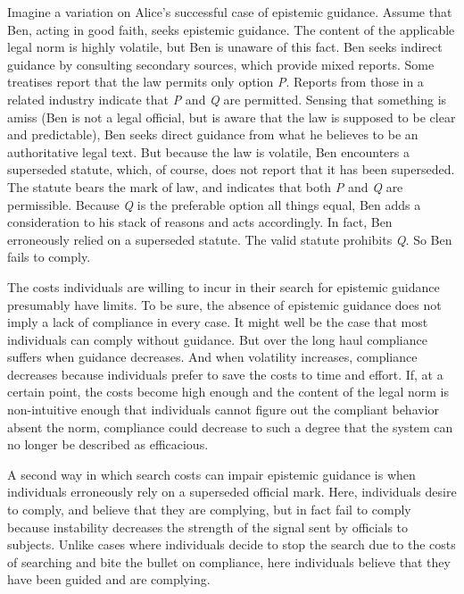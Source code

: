 Imagine a variation on Alice's successful case of epistemic guidance.
Assume that Ben, acting in good faith, seeks epistemic guidance. The
content of the applicable legal norm is highly volatile, but Ben is
unaware of this fact. Ben seeks indirect guidance by consulting
secondary sources, which provide mixed reports. Some treatises report
that the law permits only option \emph{P}. Reports from those in a
related industry indicate that \emph{P} and \emph{Q} are permitted.
Sensing that something is amiss (Ben is not a legal official, but is
aware that the law is supposed to be clear and predictable), Ben seeks
direct guidance from what he believes to be an authoritative legal text.
But because the law is volatile, Ben encounters a superseded statute,
which, of course, does not report that it has been superseded. The
statute bears the mark of law, and indicates that both \emph{P} and
\emph{Q} are permissible. Because \emph{Q} is the preferable option all
things equal, Ben adds a consideration to his stack of reasons and acts
accordingly. In fact, Ben erroneously relied on a superseded statute.
The valid statute prohibits \emph{Q}. So Ben fails to comply.

The costs individuals are willing to incur in their search for epistemic
guidance presumably have limits. To be sure, the absence of epistemic
guidance does not imply a lack of compliance in every case. It might
well be the case that most individuals can comply without guidance. But
over the long haul compliance suffers when guidance decreases. And when
volatility increases, compliance decreases because individuals prefer to
save the costs to time and effort. If, at a certain point, the costs
become high enough and the content of the legal norm is non-intuitive
enough that individuals cannot figure out the compliant behavior absent
the norm, compliance could decrease to such a degree that the system can
no longer be described as efficacious.

A second way in which search costs can impair epistemic guidance is when
individuals erroneously rely on a superseded official mark. Here,
individuals desire to comply, and believe that they are complying, but
in fact fail to comply because instability decreases the strength of the
signal sent by officials to subjects. Unlike cases where individuals
decide to stop the search due to the costs of searching and bite the
bullet on compliance, here individuals believe that they have been
guided and are complying.

